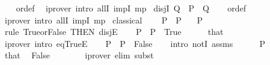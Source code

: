 \begin{isabellebody}
%
\isadelimproof
\ \ %
\endisadelimproof
%
\isatagproof
{}\isamarkupfalse%
\ or{\isacharunderscore}{\kern0pt}def\ \isamarkupfalse%
\ {\isacharparenleft}{\kern0pt}iprover\ intro{\isacharcolon}{\kern0pt}\ allI\ impI\ mp{\isacharparenright}{\kern0pt}%
\endisatagproof
{\isafoldproof}%
%
\isadelimproof
\isanewline
%
\endisadelimproof
\isanewline
{}\isamarkupfalse%
\ disjI{}{\isacharcolon}{\kern0pt}\ {\isachardoublequoteopen}Q\ {\isasymLongrightarrow}\ P\ {\isasymor}\ Q{\isachardoublequoteclose}\isanewline
%
\isadelimproof
\ \ %
\endisadelimproof
%
\isatagproof
{}\isamarkupfalse%
\ or{\isacharunderscore}{\kern0pt}def\ \isamarkupfalse%
\ {\isacharparenleft}{\kern0pt}iprover\ intro{\isacharcolon}{\kern0pt}\ allI\ impI\ mp{\isacharparenright}{\kern0pt}%
\endisatagproof
{\isafoldproof}%
%
\isadelimproof
%
\endisadelimproof
%
\isadelimdocument
%
\endisadelimdocument
%
\isatagdocument
%
\isamarkuptrue%
%
\endisatagdocument
{\isafolddocument}%
%
\isadelimdocument
%
\endisadelimdocument
{}\isamarkupfalse%
\ classical{\isacharcolon}{\kern0pt}\isanewline
\ \ \ {\isachardoublequoteopen}{\isasymnot}\ P\ {\isasymLongrightarrow}\ P{\isachardoublequoteclose}\isanewline
\ \ \ P\isanewline
%
\isadelimproof
%
\endisadelimproof
%
\isatagproof
{}\isamarkupfalse%
\ {\isacharparenleft}{\kern0pt}rule\ True{\isacharunderscore}{\kern0pt}or{\isacharunderscore}{\kern0pt}False\ {\isacharbrackleft}{\kern0pt}THEN\ disjE{\isacharbrackright}{\kern0pt}{\isacharparenright}{\kern0pt}\isanewline
\ \ \isamarkupfalse%
\ P\ \ {\isachardoublequoteopen}P\ {\isacharequal}{\kern0pt}\ True{\isachardoublequoteclose}\isanewline
\ \ \ \ \isamarkupfalse%
\ that\ \isamarkupfalse%
\ {\isacharparenleft}{\kern0pt}iprover\ intro{\isacharcolon}{\kern0pt}\ eqTrueE{\isacharparenright}{\kern0pt}\isanewline
\ \ \isamarkupfalse%
\ P\ \ {\isachardoublequoteopen}P\ {\isacharequal}{\kern0pt}\ False{\isachardoublequoteclose}\isanewline
\ \ \isamarkupfalse%
\ {\isacharparenleft}{\kern0pt}intro\ notI\ assms{\isacharparenright}{\kern0pt}\isanewline
\ \ \ \ \isamarkupfalse%
\ P\isanewline
\ \ \ \ \isamarkupfalse%
\ that\ \isamarkupfalse%
\ False\isanewline
\ \ \ \ \ \ \isamarkupfalse%
\ {\isacharparenleft}{\kern0pt}iprover\ elim{\isacharcolon}{\kern0pt}\ subst{\isacharparenright}{\kern0pt}\isanewline

\end{isabellebody}
